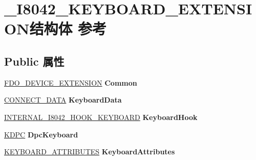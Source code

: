 \hypertarget{struct___i8042___k_e_y_b_o_a_r_d___e_x_t_e_n_s_i_o_n}{}\section{\+\_\+\+I8042\+\_\+\+K\+E\+Y\+B\+O\+A\+R\+D\+\_\+\+E\+X\+T\+E\+N\+S\+I\+O\+N结构体 参考}
\label{struct___i8042___k_e_y_b_o_a_r_d___e_x_t_e_n_s_i_o_n}
\subsection*{Public 属性}
\begin{DoxyCompactItemize}
\item 
\mbox{\label{struct___i8042___k_e_y_b_o_a_r_d___e_x_t_e_n_s_i_o_n_a46734b4ec71c96ab51bc94937e7f84a1}} 
\hyperlink{struct_f_d_o___d_e_v_i_c_e___e_x_t_e_n_s_i_o_n}{F\+D\+O\+\_\+\+D\+E\+V\+I\+C\+E\+\_\+\+E\+X\+T\+E\+N\+S\+I\+ON} {\bfseries Common}
\item 
\mbox{\label{struct___i8042___k_e_y_b_o_a_r_d___e_x_t_e_n_s_i_o_n_a2623a370187b12d84897c96626c6ee90}} 
\hyperlink{struct___c_o_n_n_e_c_t___d_a_t_a}{C\+O\+N\+N\+E\+C\+T\+\_\+\+D\+A\+TA} {\bfseries Keyboard\+Data}
\item 
\mbox{\label{struct___i8042___k_e_y_b_o_a_r_d___e_x_t_e_n_s_i_o_n_aaa4479c31f003b6ef10a982cfa269311}} 
\hyperlink{struct___i_n_t_e_r_n_a_l___i8042___h_o_o_k___k_e_y_b_o_a_r_d}{I\+N\+T\+E\+R\+N\+A\+L\+\_\+\+I8042\+\_\+\+H\+O\+O\+K\+\_\+\+K\+E\+Y\+B\+O\+A\+RD} {\bfseries Keyboard\+Hook}
\item 
\mbox{\label{struct___i8042___k_e_y_b_o_a_r_d___e_x_t_e_n_s_i_o_n_a9a14a7f890921408d49034f6d0058a89}} 
\hyperlink{struct___k_d_p_c}{K\+D\+PC} {\bfseries Dpc\+Keyboard}
\item 
\mbox{\label{struct___i8042___k_e_y_b_o_a_r_d___e_x_t_e_n_s_i_o_n_a3b0230324fe5c78b8e49aede50505140}} 
\hyperlink{struct___k_e_y_b_o_a_r_d___a_t_t_r_i_b_u_t_e_s}{K\+E\+Y\+B\+O\+A\+R\+D\+\_\+\+A\+T\+T\+R\+I\+B\+U\+T\+ES} {\bfseries Keyboard\+Attributes}

\end{DoxyCompactItemize}
